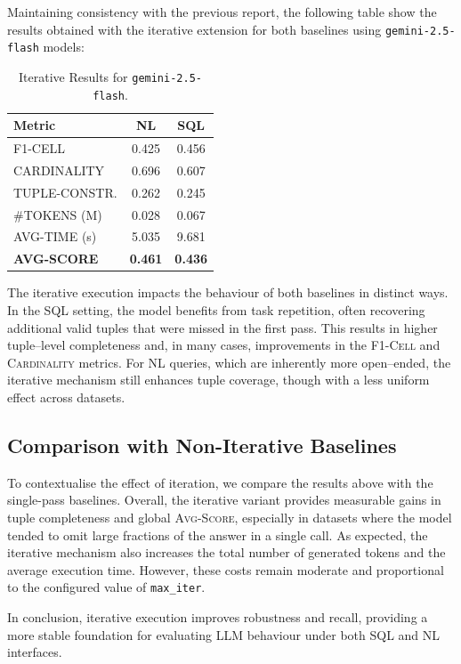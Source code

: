 Maintaining consistency with the previous report, the following table show the results obtained with the iterative extension for both baselines using \texttt{gemini-2.5-flash} models:
\begin{table}[h!]
\centering
\begin{tabular}{lcc}
\toprule
Metric & NL & SQL \\
\midrule
F1-CELL       & 0.425 & 0.456 \\
CARDINALITY   & 0.696 & 0.607 \\
TUPLE-CONSTR. & 0.262 & 0.245 \\
\#TOKENS (M)   & 0.028 & 0.067 \\
AVG-TIME (s)  & 5.035 & 9.681 \\
\textbf{AVG-SCORE} & \textbf{0.461} & \textbf{0.436} \\
\bottomrule
\end{tabular}
\caption{Iterative Results for \texttt{gemini-2.5-flash}.}
\label{tab:iter_gemini}
\end{table}


The iterative execution impacts the behaviour of both baselines in distinct
ways. In the SQL setting, the model benefits from task repetition, often
recovering additional valid tuples that were missed in the first pass. This
results in higher tuple–level completeness and, in many cases, improvements in
the \textsc{F1-Cell} and \textsc{Cardinality} metrics.  
For NL queries, which are inherently more open–ended, the iterative mechanism
still enhances tuple coverage, though with a less uniform effect across
datasets.

\subsection{Comparison with Non-Iterative Baselines}
To contextualise the effect of iteration, we compare the results above with the
single-pass baselines. Overall, the iterative variant provides measurable gains 
in tuple completeness and global \textsc{Avg-Score}, especially in datasets where 
the model tended to omit large fractions of the answer in a single call.  
As expected, the iterative mechanism also increases the total number of
generated tokens and the average execution time. However, these costs remain
moderate and proportional to the configured value of \texttt{max\_iter}.

In conclusion, iterative execution improves robustness and recall, providing a
more stable foundation for evaluating LLM behaviour under both SQL and NL
interfaces.


